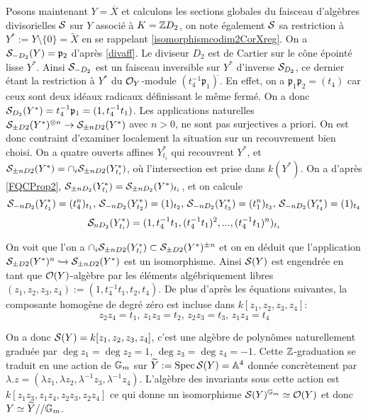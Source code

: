 Posons maintenant $Y=\overline{X}$ et calculons les sections globales du faisceau d'algèbres divisorielles $\mathcal{S}$ sur $Y$ associé à $K=\mathbb{Z} D_2$, on note également $\mathcal{S}$ sa restriction à $Y^*:=Y\setminus\lbrace0\rbrace=\widetilde{X}$ en se rappelant \ref{isomorphismcodim2CorXreg}. On a $\mathcal{S}_{-D_2}(Y)=\mathfrak{p}_2$ d'après \ref{divaff}. Le diviseur $D_2$ est de Cartier sur le cône épointé lisse $Y^*$. Ainsi $\mathcal{S}_{-D_2}$ est un faisceau inversible sur $Y^*$ d'inverse $\mathcal{S}_{D_2}$, ce dernier étant la restriction à $Y^*$ du $\mathcal{O}_{Y}$-module $(t_4^{-1}\mathfrak{p}_1)^{\widetilde{}}$. En effet, on a $\mathfrak{p}_1\mathfrak{p}_2=(t_4)$ car ceux sont deux idéaux radicaux définissant le même fermé.  On a donc $\mathcal{S}_{D_2}(Y^*)=t_4^{-1}\mathfrak{p}_1=(1, t_4^{-1}t_1)$. Les applications naturelles $\mathcal{S}_{\pm D2}(Y^*)^{\otimes n}\rightarrow \mathcal{S}_{\pm nD2}(Y^*)$ avec $n>0$, ne sont pas surjectives a priori. On est donc contraint d'examiner localement la situation sur un recouvrement bien choisi. On a quatre ouverts affines $Y^*_{t_i}$ qui recouvrent $Y^*$, et $\mathcal{S}_{\pm nD2}(Y^*)=\cap_i \mathcal{S}_{\pm nD2}(Y^*_{t_i})$, où l'intersection est prise dans $k(Y^*)$. On a d'après \ref{FQCProp2}, $\mathcal{S}_{\pm nD_2}(Y^*_{t_i})=\mathcal{S}_{\pm nD_2}(Y^*)_{t_i}$, et on calcule 
$$\mathcal{S}_{-nD_2}(Y^*_{t_1})=(t_4^n)_{t_1},\,\mathcal{S}_{-nD_2}(Y^*_{t_2})=(1)_{t_2},\,\mathcal{S}_{-nD_2}(Y^*_{t_3})=(t_1^n)_{t_3},\,\mathcal{S}_{-nD_2}(Y^*_{t_4})=(1)_{t_4}$$
$$\mathcal{S}_{nD_2}(Y^*_{t_i})=(1,t_4^{-1}t_1,(t_4^{-1}t_1)^2,...,(t_4^{-1}t_1)^n)_{t_i}$$

On voit que l'on a $\cap_i \mathcal{S}_{\pm nD2}(Y^*_{t_i})\subset \mathcal{S}_{\pm D2}(Y^*)^{\pm n}$ et on en déduit que l'application $\mathcal{S}_{\pm D2}(Y^*)^n\xhookrightarrow{} \mathcal{S}_{\pm nD2}(Y^*)$ est un isomorphisme. Ainsi $\mathcal{S}(Y)$ est engendrée en tant que $\mathcal{O}(Y)$-algèbre par les éléments algébriquement libres $(z_1,z_2,z_3,z_4):=(1, t_4^{-1}t_1,t_2,t_4)$. De plus d'après les équations suivantes, la composante homogène de degré zéro est incluse dans $k[z_1,z_2,z_3,z_4]$:
$$ z_2z_4=t_1,\, z_1z_3=t_2,\, z_2z_3=t_3,\, z_1z_4=t_4$$

On a donc $\mathcal{S}(Y)=k[z_1,z_2,z_3,z_4]$, c'est une algèbre de polynômes naturellement graduée par $\deg z_1=\deg z_2=1$, $\deg z_3=\deg z_4=-1$. Cette $\mathbb{Z}$-graduation se traduit en une action de $\mathbb{G}_m$ sur $\widetilde{Y}:=\operatorname{Spec} \mathcal{S}(Y)=\mathbb{A}^4$ donnée concrètement par $\lambda.z=(\lambda z_1,\lambda z_2,\lambda^{-1} z_3,\lambda^{-1} z_4)$. L'algèbre des invariants sous cette action est $k[z_1z_3,z_1z_4,z_2z_3,z_2z_4]$ ce qui donne un isomorphisme $\mathcal{S}(Y)^{\mathbb{G}_m}\simeq \mathcal{O}(Y)$ et donc $Y\simeq \widetilde{Y}//\mathbb{G}_m$.

